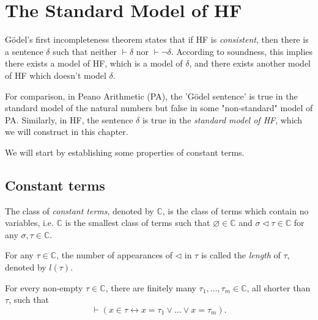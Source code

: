 \chapter{The Standard Model of HF}

Gödel's first incompleteness theorem states that if HF is \textit{consistent}, 
then there is a sentence $\delta$ such that neither $\vdash \delta$ nor
$\vdash \neg\delta$. According to soundness, 
this implies there exists a model of HF, which is
a model of $\delta$, and there exists another model of HF which doesn't model $\delta$.

For comparison, in Peano Arithmetic (PA), the 'Gödel sentence' is true in the standard model of 
the natural numbers but false in some "non-standard" model of PA. 
Similarly, in HF, the sentence $\delta$ is true in the \textit{standard model of HF}, 
which we will construct in this chapter.

We will start by establishing some properties of constant terms.

\section{Constant terms}

\begin{definition}
    \label{def:C+C.length}
    \leanok
    The class of \textit{constant terms}, denoted by $\mathbb{C}$, is the class of terms which
    contain no variables, i.e. $\mathbb{C}$ is the smallest class of terms such that 
    $\varnothing \in \mathbb{C}$ and 
    $\sigma \lhd \tau \in \mathbb{C}$ for any $\sigma, \tau \in \mathbb{C}$.

    For any $\tau \in \mathbb{C}$, the number of appearances of $\lhd$ in $\tau$ is called the
    \textit{length} of $\tau$, denoted by $l(\tau)$.
\end{definition}

\begin{lemma}
    \label{lem:C.exists_finset_shorter_and_mem_iff_iSup}
    \leanok
    For every non-empty $\tau \in \mathbb{C}$, there are finitely many 
    $\tau_1, \ldots, \tau_m \in \mathbb{C}$, all shorter than $\tau$, such that
    $$
    \vdash (x \in \tau \leftrightarrow x = \tau_1 \lor \ldots \lor x = \tau_m).
    $$
\end{lemma}

